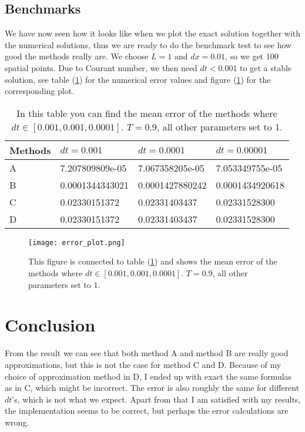 \documentclass[norsk,a4paper,12pt]{article}
\begin{document}
\subsection{Benchmarks}
We have now seen how it looks like when we plot the exact solution together with the numerical solutions, thus we are ready to do the benchmark test to see how good the methods really are. We choose $L=1$ and $dx=0.01$, so we get 100 spatial points. Due to Courant number, we then need $dt<0.001$ to get a stable solution, see table (\ref{tab:error}) for the numerical error values and figure (\ref{error}) for the corresponding plot.
\begin{table} [H]
\centering
\caption{In this table you can find the mean error of the methods where $dt\in[0.001,0.001,0.0001]$. $T=0.9$, all other parameters set to 1.}
\begin{tabularx}{\textwidth}{XXXX} \hline
\label{tab:error}
Methods & $dt=0.001$ & $dt=0.0001$ & $dt=0.00001$ \\ \hline
A & 7.207809809e-05 & 7.067358205e-05 & 7.053349755e-05 \\
B & 0.0001344343021 & 0.0001427880242 & 0.0001434920618 \\
C & 0.02330151372 & 0.02331403437 & 0.02331528300 \\
D & 0.02330151372 & 0.02331403437 & 0.02331528300 \\ \hline
\end{tabularx}
\end{table}
\begin{figure}[!htbp]
\centering
\texttt{[image: error\_plot.png]}
\caption{This figure is connected to table (\ref{tab:error}) and shows the mean error of the methods where $dt\in[0.001,0.001,0.0001]$. $T=0.9$, all other parameters set to 1. \label{error}}
\end{figure}

\section{Conclusion}
From the result we can see that both method A and method B are really good approximations, but this is not the case for method C and D. Because of my choice of approximation method in D, I ended up with exact the same formulas as in C, which might be incorrect. The error is also roughly the same for different $dt$'s, which is not what we expect. Apart from that I am satisfied with my results, the implementation seems to be correct, but perhaps the error calculations are wrong. 
\end{document}
